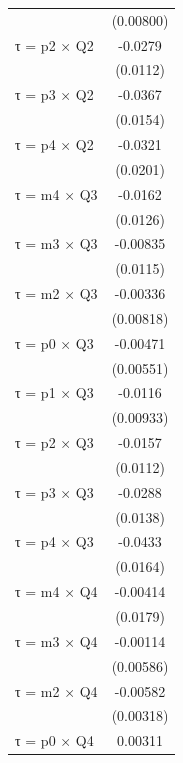 \begin{table}[htbp]
\begin{tabular}{l*{1}{c}}
                    &   (0.00800)         \\
[1em]
τ = p2 × Q2         &     -0.0279\sym{**} \\
                    &    (0.0112)         \\
[1em]
τ = p3 × Q2         &     -0.0367\sym{**} \\
                    &    (0.0154)         \\
[1em]
τ = p4 × Q2         &     -0.0321         \\
                    &    (0.0201)         \\
[1em]
τ = m4 × Q3         &     -0.0162         \\
                    &    (0.0126)         \\
[1em]
τ = m3 × Q3         &    -0.00835         \\
                    &    (0.0115)         \\
[1em]
τ = m2 × Q3         &    -0.00336         \\
                    &   (0.00818)         \\
[1em]
τ = p0 × Q3         &    -0.00471         \\
                    &   (0.00551)         \\
[1em]
τ = p1 × Q3         &     -0.0116         \\
                    &   (0.00933)         \\
[1em]
τ = p2 × Q3         &     -0.0157         \\
                    &    (0.0112)         \\
[1em]
τ = p3 × Q3         &     -0.0288\sym{**} \\
                    &    (0.0138)         \\
[1em]
τ = p4 × Q3         &     -0.0433\sym{***}\\
                    &    (0.0164)         \\
[1em]
τ = m4 × Q4         &    -0.00414         \\
                    &    (0.0179)         \\
[1em]
τ = m3 × Q4         &    -0.00114         \\
                    &   (0.00586)         \\
[1em]
τ = m2 × Q4         &    -0.00582\sym{*}  \\
                    &   (0.00318)         \\
[1em]
τ = p0 × Q4         &     0.00311         \\

\end{tabular}
\end{table}
